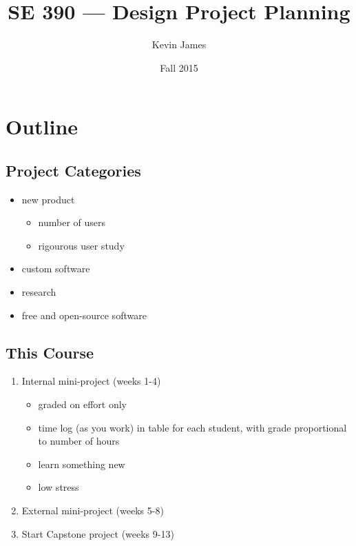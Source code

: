 \documentclass[12pt]{article}
\begin{document}
\title{SE 390 --- Design Project Planning}
\author{Kevin James}
\date{\vspace{-2ex}Fall 2015}
\maketitle\HRule

\tableofcontents
\newpage

\section{Outline}
\subsection{Project Categories}
\begin{itemize}
\item new product
\begin{itemize}
\item number of users
\item rigourous user study
\end{itemize}
\item custom software
\item research
\item free and open-source software
\end{itemize}

\subsection{This Course}
\begin{enumerate}
\item Internal mini-project (weeks 1-4)
\begin{itemize}
\item graded on effort only
\item time log (as you work) in table for each student, with grade proportional to number of hours
\item learn something new
\item low stress
\end{itemize}
\item External mini-project (weeks 5-8)
\item Start Capstone project (weeks 9-13)
\end{enumerate}
\end{document}
